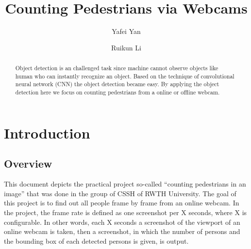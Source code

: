 \documentclass[runningheads]{llncs}
\newcommand{\quotes}[1]{``#1''}
\begin{document}
%
\title{Counting Pedestrians via Webcams}
%
%
\author{Yafei Yan\inst{}\orcidID{} \and
Ruikun Li\inst{}\orcidID{}}
%
%
%
\maketitle              %
%
\begin{abstract}
Object detection is an challenged task since machine cannot observe objects like human who can instantly recognize an object. Based on the technique of convolutional neural network (CNN) the object detection became easy. By applying the object detection here we focus on counting pedestrians from a online or offline webcam.

\end{abstract}
%
%
%
\section{Introduction}
\subsection{Overview}
This document depicts the practical project so-called  \quotes{counting pedestrians in an image} that was done in the group of CSSH of RWTH University. The goal of this project is to find out all people frame by frame from an online webcam. In the project, the frame rate is defined as one screenshot per X seconds, where X is configurable. In other words, each X seconds a screenshot of the viewport of an online webcam is taken, then a screenshot, in which the number of persons and the bounding box of each detected persons is given, is output.
\end{document}
